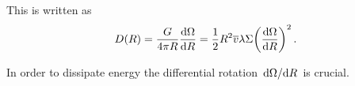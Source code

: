 \documentclass[main.tex]{subfiles}
\begin{document}
This is written as 
%
\begin{align}
D(R) = \frac{G}{4 \pi R} \dv{\Omega }{R}
= \frac{1}{2} R^2 \overline{v} \lambda \Sigma \qty(\dv{\Omega }{R})^2
\,.
\end{align}

In order to dissipate energy the differential rotation \(\dv*{\Omega }{R}\) is crucial. 
\end{document}
